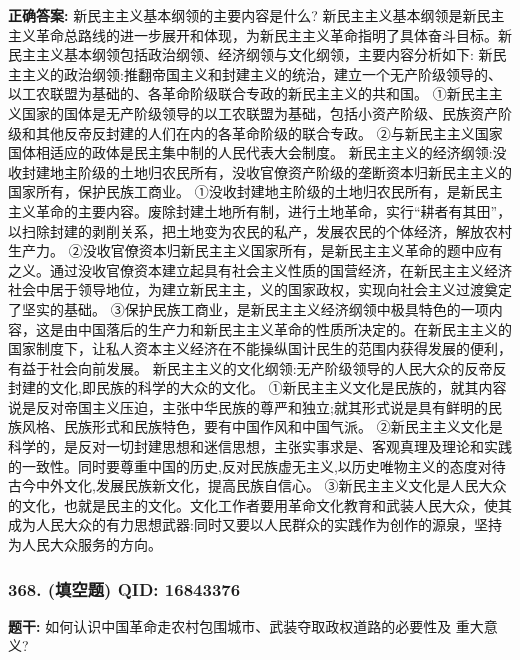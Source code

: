 \documentclass[12pt,UTF8]{ctexart}
\begin{document}
\textbf{正确答案:}
新民主主义基本纲领的主要内容是什么?
新民主主义基本纲领是新民主主义革命总路线的进一步展开和体现，为新民主主义革命指明了具体奋斗目标。新民主主义基本纲领包括政治纲领、经济纲领与文化纲领，主要内容分析如下:
新民主主义的政治纲领:推翻帝国主义和封建主义的统治，建立一个无产阶级领导的、以工农联盟为基础的、各革命阶级联合专政的新民主主义的共和国。
①新民主主义国家的国体是无产阶级领导的以工农联盟为基础，包括小资产阶级、民族资产阶级和其他反帝反封建的人们在内的各革命阶级的联合专政。
②与新民主主义国家国体相适应的政体是民主集中制的人民代表大会制度。
新民主主义的经济纲领:没收封建地主阶级的土地归农民所有，没收官僚资产阶级的垄断资本归新民主主义的国家所有，保护民族工商业。
①没收封建地主阶级的土地归农民所有，是新民主主义革命的主要内容。废除封建土地所有制，进行土地革命，实行“耕者有其田”，以扫除封建的剥削关系，把土地变为农民的私产，发展农民的个体经济，解放农村生产力。
②没收官僚资本归新民主主义国家所有，是新民主主义革命的题中应有之义。通过没收官僚资本建立起具有社会主义性质的国营经济，在新民主主义经济社会中居于领导地位，为建立新民主主，义的国家政权，实现向社会主义过渡奠定了坚实的基础。
③保护民族工商业，是新民主主义经济纲领中极具特色的一项内容，这是由中国落后的生产力和新民主主义革命的性质所决定的。在新民主主义的国家制度下，让私人资本主义经济在不能操纵国计民生的范围内获得发展的便利，有益于社会向前发展。
新民主主义的文化纲领:无产阶级领导的人民大众的反帝反封建的文化,即民族的科学的大众的文化。
①新民主主义文化是民族的，就其内容说是反对帝国主义压迫，主张中华民族的尊严和独立;就其形式说是具有鲜明的民族风格、民族形式和民族特色，要有中国作风和中国气派。
②新民主主义文化是科学的，是反对一切封建思想和迷信思想，主张实事求是、客观真理及理论和实践的一致性。同时要尊重中国的历史,反对民族虚无主义,以历史唯物主义的态度对待古今中外文化,发展民族新文化，提高民族自信心。
③新民主主义文化是人民大众的文化，也就是民主的文化。文化工作者要用革命文化教育和武装人民大众，使其成为人民大众的有力思想武器:同时又要以人民群众的实践作为创作的源泉，坚持为人民大众服务的方向。

\vspace{0.3em}\hrulefill\vspace{0.7em}

\subsubsection*{368. (填空题) \small QID: 16843376}

\textbf{题干:}
如何认识中国革命走农村包围城市、武装夺取政权道路的必要性及 重大意义?
\end{document}
